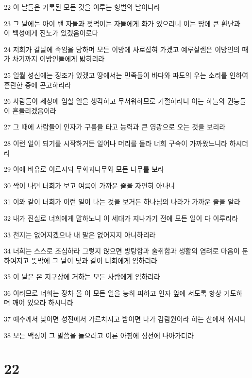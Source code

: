 \par 22 이 날들은 기록된 모든 것을 이루는 형벌의 날이니라
\par 23 그 날에는 아이 밴 자들과 젖먹이는 자들에게 화가 있으리니 이는 땅에 큰 환난과 이 백성에게 진노가 있겠음이로다
\par 24 저희가 칼날에 죽임을 당하며 모든 이방에 사로잡혀 가겠고 예루살렘은 이방인의 때가 차기까지 이방인들에게 밟히리라
\par 25 일월 성신에는 징조가 있겠고 땅에서는 민족들이 바다와 파도의 우는 소리를 인하여 혼란한 중에 곤고하리라
\par 26 사람들이 세상에 임할 일을 생각하고 무서워하므로 기절하리니 이는 하늘의 권능들이 흔들리겠음이라
\par 27 그 때에 사람들이 인자가 구름을 타고 능력과 큰 영광으로 오는 것을 보리라
\par 28 이런 일이 되기를 시작하거든 일어나 머리를 들라 너희 구속이 가까왔느니라 하시더라
\par 29 이에 비유로 이르시되 무화과나무와 모든 나무를 보라
\par 30 싹이 나면 너희가 보고 여름이 가까운 줄을 자연히 아나니
\par 31 이와 같이 너희가 이런 일이 나는 것을 보거든 하나님의 나라가 가까운 줄을 알라
\par 32 내가 진실로 너희에게 말하노니 이 세대가 지나가기 전에 모든 일이 다 이루리라
\par 33 천지는 없어지겠으나 내 말은 없어지지 아니하리라
\par 34 너희는 스스로 조심하라 그렇지 않으면 방탕함과 술취함과 생활의 염려로 마음이 둔하여지고 뜻밖에 그 날이 덫과 같이 너희에게 임하리라
\par 35 이 날은 온 지구상에 거하는 모든 사람에게 임하리라
\par 36 이러므로 너희는 장차 올 이 모든 일을 능히 피하고 인자 앞에 서도록 항상 기도하며 깨어 있으라 하시니라
\par 37 예수께서 낮이면 성전에서 가르치시고 밤이면 나가 감람원이라 하는 산에서 쉬시니
\par 38 모든 백성이 그 말씀을 들으려고 이른 아침에 성전에 나아가더라

\chapter{22}


